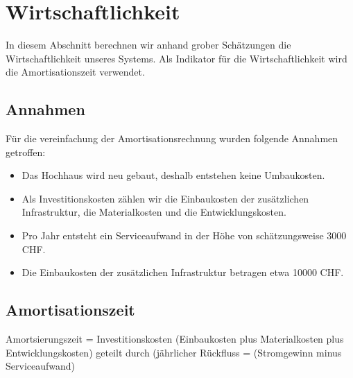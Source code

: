 \section{Wirtschaftlichkeit} \label{sec:wirtschaftlichkeit}
In diesem Abschnitt berechnen wir anhand grober Schätzungen die Wirtschaftlichkeit unseres Systems. 
Als Indikator für die Wirtschaftlichkeit wird die Amortisationszeit verwendet.
\subsection{Annahmen}
Für die vereinfachung der Amortisationsrechnung wurden folgende Annahmen getroffen:\\
\begin{itemize}  
\item Das Hochhaus wird neu gebaut, deshalb entstehen keine Umbaukosten.
\item Als Investitionskosten zählen wir die Einbaukosten der zusätzlichen Infrastruktur, die Materialkosten und die Entwicklungskosten.
\item Pro Jahr entsteht ein Serviceaufwand in der Höhe von schätzungsweise 3000 CHF.
\item Die Einbaukosten der zusätzlichen Infrastruktur betragen etwa 10000 CHF.
\end{itemize}

\subsection{Amortisationszeit}
Amortsierungszeit = Investitionskosten (Einbaukosten plus Materialkosten plus Entwicklungskosten) geteilt durch (jährlicher Rückfluss = (Stromgewinn minus Serviceaufwand)
